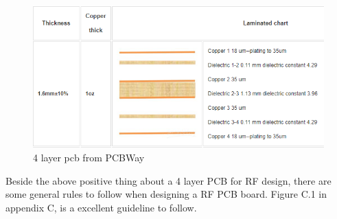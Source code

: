 \begin{figure}[h]
\centering
\includegraphics[scale=0.8]{figures/PCB4.PNG}
\caption{4 layer pcb from PCBWay \cite{PCB}}
\end{figure}

Beside the above positive thing about a 4 layer PCB for RF design, there are some general rules to follow when designing a RF PCB board. Figure C.1 in appendix C, is a excellent guideline to follow.   



